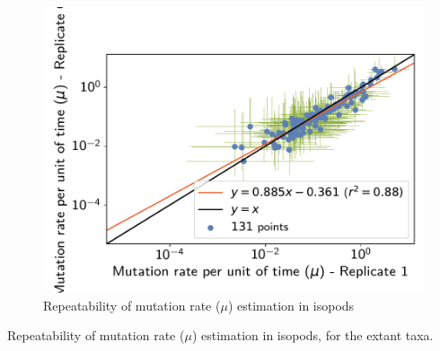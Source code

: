 \documentclass{article}
\begin{document}
\begin{figure}[H]
\begin{minipage}{0.32\linewidth}
			\includegraphics[width=\linewidth, page=1]{isopods/12CDS_SiteMutSelBranchNe_Rep-1-6_LogMutationRatePerTime}
		\end{minipage}
		\caption[Repeatability of $\mu$ estimation in isopods]{Repeatability of mutation rate ($\mu$) estimation in isopods}
	\end{figure}

	\begin{table}[htbp]
		\renewcommand{\arraystretch}{0.5}
		\scriptsize
		\noindent{}
		\caption[Repeatability of mutation rate estimation in isopods]{Repeatability of mutation rate ($\mu$) estimation in isopods, for the extant taxa.}
	\end{table}
\end{document}
